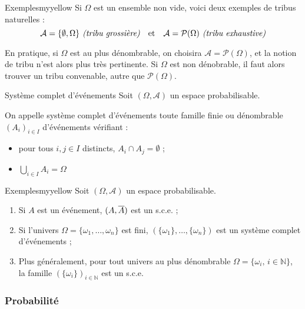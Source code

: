     \begin{omed}{Exemples}{myyellow}
        Si $\Omega$ est un ensemble non vide, voici deux exemples de tribus naturelles :
        \[ \mathcal{A} = \{\emptyset, \Omega\} \textit{ (tribu grossière)} \quad \text{et} \quad \mathcal{A} = \mathcal{P}(\Omega) \textit{ (tribu exhaustive)} \]
    \end{omed}

    En pratique, si $\Omega$ est au plus dénombrable, on choisira $\mathcal{A} = \mathcal{P}(\Omega)$, et la notion de tribu n’est alors plus très pertinente. Si $\Omega$ est non dénobrable, il faut alors trouver un tribu convenable, autre que $\mathcal{P}(\Omega)$.

    \begin{defi}{Système complet d’événements}{}
        Soit $(\Omega, \mathcal{A})$ un espace probabilisable. 
        
        On appelle système complet d’événements toute famille finie ou dénombrable $(A_i)_{i \in I}$ d’événements vérifiant :
        \begin{itemize}
            \item pour tous $i,j \in I$ distincts, $A_i \cap A_j = \emptyset$ ;
            \item $\bigcup_{i \in I} A_i = \Omega$
        \end{itemize}
    \end{defi}

    \begin{omed}{Exemples}{myyellow}
        Soit $(\Omega,\mathcal{A})$ un espace probabilisable.
        \begin{enumerate}[label=\textcolor{myyellow}{\arabic*}]
            \item Si $A$ est un événement, $(A, \overline{A})$ est un s.c.e. ;
            \item Si l’univers $\Omega = \{ \omega_1,\ldots,\omega_n\}$ est fini, $(\{\omega_1\}, \ldots, \{\omega_n\})$ est un système complet d’événements ;
            \item Plus généralement, pour tout univers au plus dénombrable $\Omega = \{\omega_i, \, i \in \mathbb{N} \}$, la famille $(\{\omega_i\})_{i \in \mathbb{N}}$ est un s.c.e.
        \end{enumerate}
    \end{omed}

    \subsubsection{Probabilité}

